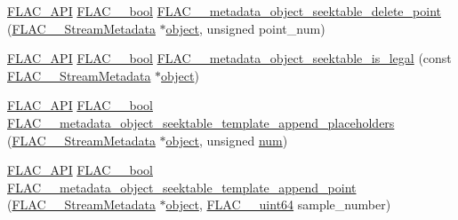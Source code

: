 \begin{DoxyCompactItemize}
\item 
\mbox{\hyperlink{group__flac__export_ga56ca07df8a23310707732b1c0007d6f5}{F\+L\+A\+C\+\_\+\+A\+PI}} \mbox{\hyperlink{ordinals_8h_a95103469f1cbd78b8cf250194985b34e}{F\+L\+A\+C\+\_\+\+\_\+bool}} \mbox{\hyperlink{group__flac__metadata__object_ga5a865f792845cbf22b5935c3d96568d1}{F\+L\+A\+C\+\_\+\+\_\+metadata\+\_\+object\+\_\+seektable\+\_\+delete\+\_\+point}} (\mbox{\hyperlink{struct_f_l_a_c_____stream_metadata}{F\+L\+A\+C\+\_\+\+\_\+\+Stream\+Metadata}} $\ast$\mbox{\hyperlink{_s_d_l__opengl__glext_8h_ab49790263c78300fbf05719e38246198}{object}}, unsigned point\+\_\+num)
\item 
\mbox{\hyperlink{group__flac__export_ga56ca07df8a23310707732b1c0007d6f5}{F\+L\+A\+C\+\_\+\+A\+PI}} \mbox{\hyperlink{ordinals_8h_a95103469f1cbd78b8cf250194985b34e}{F\+L\+A\+C\+\_\+\+\_\+bool}} \mbox{\hyperlink{group__flac__metadata__object_ga08f33e2ef85d72363dda82de3208ed1e}{F\+L\+A\+C\+\_\+\+\_\+metadata\+\_\+object\+\_\+seektable\+\_\+is\+\_\+legal}} (const \mbox{\hyperlink{struct_f_l_a_c_____stream_metadata}{F\+L\+A\+C\+\_\+\+\_\+\+Stream\+Metadata}} $\ast$\mbox{\hyperlink{_s_d_l__opengl__glext_8h_ab49790263c78300fbf05719e38246198}{object}})
\item 
\mbox{\hyperlink{group__flac__export_ga56ca07df8a23310707732b1c0007d6f5}{F\+L\+A\+C\+\_\+\+A\+PI}} \mbox{\hyperlink{ordinals_8h_a95103469f1cbd78b8cf250194985b34e}{F\+L\+A\+C\+\_\+\+\_\+bool}} \mbox{\hyperlink{group__flac__metadata__object_gae9d8c43dc78bde9778c4e57c5f74b025}{F\+L\+A\+C\+\_\+\+\_\+metadata\+\_\+object\+\_\+seektable\+\_\+template\+\_\+append\+\_\+placeholders}} (\mbox{\hyperlink{struct_f_l_a_c_____stream_metadata}{F\+L\+A\+C\+\_\+\+\_\+\+Stream\+Metadata}} $\ast$\mbox{\hyperlink{_s_d_l__opengl__glext_8h_ab49790263c78300fbf05719e38246198}{object}}, unsigned \mbox{\hyperlink{_s_d_l__opengl__glext_8h_abb50fc1ead3a02a46fb52daa2045f95c}{num}})
\item 
\mbox{\hyperlink{group__flac__export_ga56ca07df8a23310707732b1c0007d6f5}{F\+L\+A\+C\+\_\+\+A\+PI}} \mbox{\hyperlink{ordinals_8h_a95103469f1cbd78b8cf250194985b34e}{F\+L\+A\+C\+\_\+\+\_\+bool}} \mbox{\hyperlink{group__flac__metadata__object_ga9ce1940ca29d71739316cf104256c078}{F\+L\+A\+C\+\_\+\+\_\+metadata\+\_\+object\+\_\+seektable\+\_\+template\+\_\+append\+\_\+point}} (\mbox{\hyperlink{struct_f_l_a_c_____stream_metadata}{F\+L\+A\+C\+\_\+\+\_\+\+Stream\+Metadata}} $\ast$\mbox{\hyperlink{_s_d_l__opengl__glext_8h_ab49790263c78300fbf05719e38246198}{object}}, \mbox{\hyperlink{ordinals_8h_aa78c8c70a3eb8a58af7436f278acde8e}{F\+L\+A\+C\+\_\+\+\_\+uint64}} sample\+\_\+number)

\end{DoxyCompactItemize}
